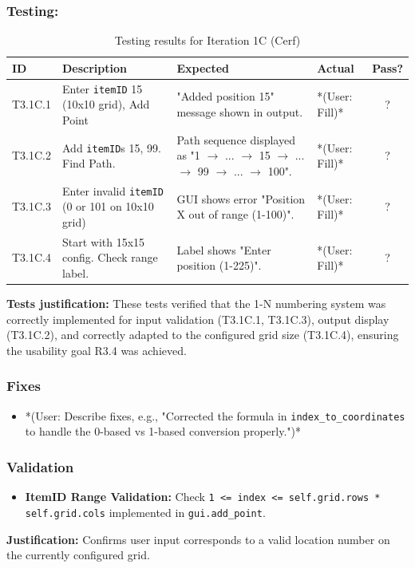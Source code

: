 \subsubsection{Testing:}
\begin{table}[htbp]
	\centering
	\begin{tabularx}{\textwidth}{|l|X|p{4.5cm}|p{1.5cm}|c|}
		\hline
		\textbf{ID} & \textbf{Description} & \textbf{Expected} & \textbf{Actual} & \textbf{Pass?} \\
		\hline
		T3.1C.1 & Enter \verb|itemID| 15 (10x10 grid), Add Point & "Added position 15" message shown in output. & *(User: Fill)* & ? \\
		\hline
		T3.1C.2 & Add \verb|itemID|s 15, 99. Find Path. & Path sequence displayed as "1 $ \rightarrow $ ... $ \rightarrow $ 15 $ \rightarrow $ ... $ \rightarrow $ 99 $ \rightarrow $ ... $ \rightarrow $ 100". & *(User: Fill)* & ? \\
		\hline
		T3.1C.3 & Enter invalid \verb|itemID| (0 or 101 on 10x10 grid) & GUI shows error "Position X out of range (1-100)". & *(User: Fill)* & ? \\
		\hline
		T3.1C.4 & Start with 15x15 config. Check range label. & Label shows "Enter position (1-225)". & *(User: Fill)* & ? \\
		\hline
	\end{tabularx}
	\caption{Testing results for Iteration 1C (Cerf)}
\end{table}
\textbf{Tests justification:} These tests verified that the 1-N numbering system was correctly implemented for input validation (T3.1C.1, T3.1C.3), output display (T3.1C.2), and correctly adapted to the configured grid size (T3.1C.4), ensuring the usability goal R3.4 was achieved.

\subsubsection{Fixes}
\begin{itemize}
	\item *(User: Describe fixes, e.g., "Corrected the formula in \verb|index_to_coordinates| to handle the 0-based vs 1-based conversion properly.")*
\end{itemize}

\subsubsection{Validation}
\begin{itemize}
	\item \textbf{ItemID Range Validation:} Check \verb|1 <= index <= self.grid.rows * self.grid.cols| implemented in \verb|gui.add_point|.
\end{itemize}
\textbf{Justification:} Confirms user input corresponds to a valid location number on the currently configured grid.

